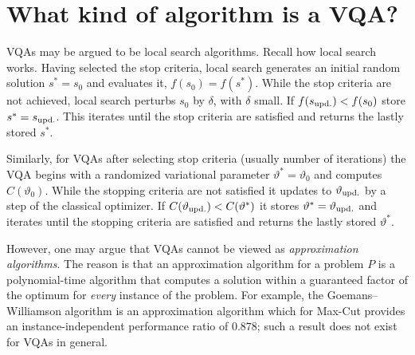 \documentclass[handoutsbeamer.tex]{subfiles}
\begin{document}
\section{What kind of algorithm is a VQA?}

\begin{frame}
VQAs may be argued to be local search algorithms. Recall how local search works. Having selected the stop criteria, local search generates an initial random solution $s^* = s_0$ and evaluates it, $f(s_0)=f(s^*)$. While the stop criteria are not achieved, local search perturbs $s_0$ by $\delta$, with $\delta$ small. If $f(s_{\rm upd.}) < f(s_{0})$ store $s^* = s_{\rm upd.}$. This iterates until the stop criteria are satisfied and returns the lastly stored $s^*$.

Similarly, for VQAs after selecting stop criteria (usually number of iterations) the VQA begins with a randomized variational parameter $\vartheta^* = \vartheta_0$ and computes $C(\vartheta_0)$. While the stopping criteria are not satisfied it updates to $\vartheta_{\rm upd.}$ by a step of the classical optimizer. If $C(\vartheta_{\rm upd.}) < C(\vartheta^*)$ it stores $\vartheta^* = \vartheta_{\rm upd.}$ and iterates until the stopping criteria are satisfied and returns the lastly stored $\vartheta^*$.
\end{frame}

\begin{frame}
However, one may argue that VQAs cannot be viewed as \emph{approximation algorithms}. The reason is that an approximation algorithm for a problem $P$ is a polynomial-time algorithm that computes a solution within a guaranteed factor of the optimum for \emph{every} instance of the problem. For example, the Goemans--Williamson algorithm is an approximation algorithm which for Max-Cut provides an instance-independent performance ratio of $0.878$; such a result does not exist for VQAs in general.

\end{frame}
\end{document}
